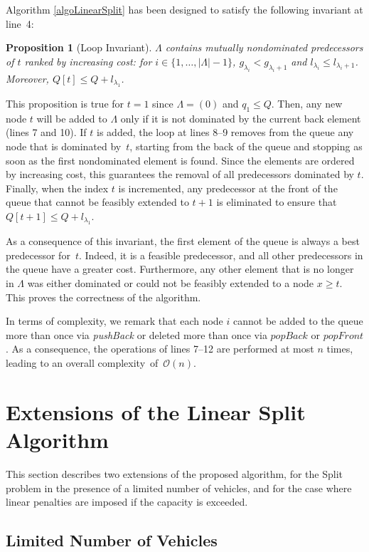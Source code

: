 \documentclass[11pt]{article}
\newtheorem{proposition}{Proposition}
\newcommand{\cO}{{\mathcal O}}
\begin{document}
Algorithm \ref{algoLinearSplit} has been designed to satisfy the following invariant at line~4:
\begin{proposition}[Loop Invariant]
$\Lambda$ contains mutually nondominated predecessors of $t$ ranked by increasing cost: for $i \in \{1,\dots,|\Lambda|-1\}$, $g_{\lambda_i} < g_{\lambda_i+1}$ and $l_{\lambda_i} \leq l_{\lambda_i+1}$.  Moreover, $Q[t] \leq Q + l_{\lambda_1}$.
\end{proposition}
This proposition is true for $t=1$ since $\Lambda = (0)$ and $q_1 \leq Q$. 
Then, any new node $t$ will be added to $\Lambda$ only if it is not dominated by the current back element (lines 7 and 10). If $t$ is added, the loop at lines 8--9 removes from the queue any node that is dominated by~$t$, starting from the back of the queue and stopping as soon as the first nondominated element is found. Since the elements are ordered by increasing cost, this guarantees the removal of all predecessors dominated by $t$. Finally, when the index $t$ is incremented, any predecessor at the front of the queue that cannot be feasibly extended to $t+1$ is eliminated to ensure that $Q[t+1] \leq Q + l_{\lambda_1}$.

As a consequence of this invariant, the first element of the queue is always a best predecessor for~$t$. Indeed, it is a feasible predecessor, and all other predecessors in the queue have a greater cost. Furthermore, any other element that is no longer in $\Lambda$ was either dominated or could not be feasibly extended to a node $x \geq t$. This proves the correctness of the algorithm.

In terms of complexity, we remark that each node $i$ cannot be added to the queue more than once via \emph{pushBack} or deleted more than once via $popBack$ or $popFront$. As a consequence, the operations of lines 7--12 are performed at most $n$ times, leading to an overall complexity~of~$\cO(n)$.

\section{Extensions of the Linear Split Algorithm}

This section describes two extensions of the proposed algorithm, for the Split problem in the presence of a limited number of vehicles, and for the case where linear penalties are imposed if the capacity is exceeded.

\subsection{Limited Number of Vehicles}
\label{sectionLinearLimited}
\end{document}
